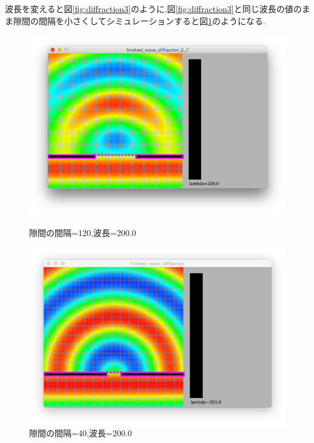 波長を変えると図\ref{fig:diffraction3}のように,図\ref{fig:diffraction3}と同じ波長の値のまま隙間の間隔を小さくしてシミュレーションすると図\ref{fig:diffraction4}のようになる.
\begin{figure}[H]
\begin{minipage}{0.5\hsize}
\begin{center}
\includegraphics[width=\linewidth]
  {../result/diffraction3.png}
\caption{隙間の間隔=120,波長=200.0}
\label{fig:diffraction3}
\end{center}
\end{minipage}%
\begin{minipage}{0.5\hsize}
\begin{center}
\includegraphics[width=\linewidth]
  {../result/diffraction4.png}
\caption{隙間の間隔=40,波長=200.0}
\label{fig:diffraction4}
\end{center}
\end{minipage}
\end{figure}

